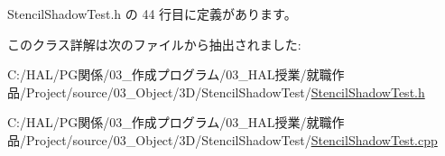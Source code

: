 Stencil\+Shadow\+Test.\+h の 44 行目に定義があります。



このクラス詳解は次のファイルから抽出されました\+:\begin{DoxyCompactItemize}
\item 
C\+:/\+H\+A\+L/\+P\+G関係/03\+\_\+作成プログラム/03\+\_\+\+H\+A\+L授業/就職作品/\+Project/source/03\+\_\+\+Object/3\+D/\+Stencil\+Shadow\+Test/\mbox{\hyperlink{_stencil_shadow_test_8h}{Stencil\+Shadow\+Test.\+h}}\item 
C\+:/\+H\+A\+L/\+P\+G関係/03\+\_\+作成プログラム/03\+\_\+\+H\+A\+L授業/就職作品/\+Project/source/03\+\_\+\+Object/3\+D/\+Stencil\+Shadow\+Test/\mbox{\hyperlink{_stencil_shadow_test_8cpp}{Stencil\+Shadow\+Test.\+cpp}}\end{DoxyCompactItemize}
